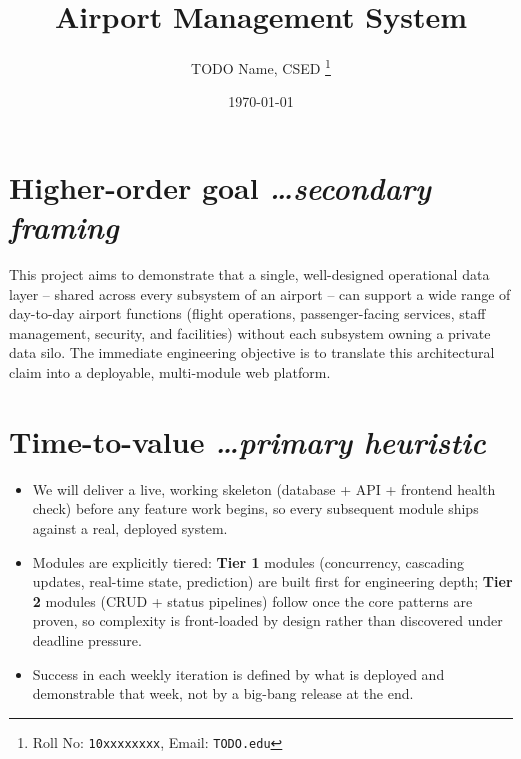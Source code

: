 \documentclass[11pt,a4paper]{article}
\title{Airport Management System}
\author{
  TODO Name, CSED%
  \thanks{Roll No: \texttt{10xxxxxxxx}, %
    Email: \texttt{TODO\@thapar.edu}}
}
\date{\today}
\newcommand{\BvrHint}[1]{%
  {\normalfont\normalsize\itshape\hfill #1}}
\begin{document}
\maketitle

\section{Higher-order goal%
  \BvrHint{\ldots secondary framing}}
This project aims to demonstrate that a single, well-designed
operational data layer -- shared across every subsystem of an airport
-- can support a wide range of day-to-day airport functions (flight
operations, passenger-facing services, staff management, security,
and facilities) without each subsystem owning a private data silo.
The immediate engineering objective is to translate this architectural
claim into a deployable, multi-module web platform.

\section{Time-to-value %
\BvrHint{\ldots primary heuristic}}
\begin{itemize}[leftmargin=0.7cm]
    \item We will deliver a live, working skeleton (database + API +
      frontend health check) before any feature work begins, so every
      subsequent module ships against a real, deployed system.
    \item Modules are explicitly tiered: \textbf{Tier 1} modules
      (concurrency, cascading updates, real-time state, prediction)
      are built first for engineering depth; \textbf{Tier 2} modules
      (CRUD + status pipelines) follow once the core patterns are
      proven, so complexity is front-loaded by design rather than
      discovered under deadline pressure.
    \item Success in each weekly iteration is defined by what is
      deployed and demonstrable that week, not by a big-bang release
      at the end.
\end{itemize}
\end{document}
